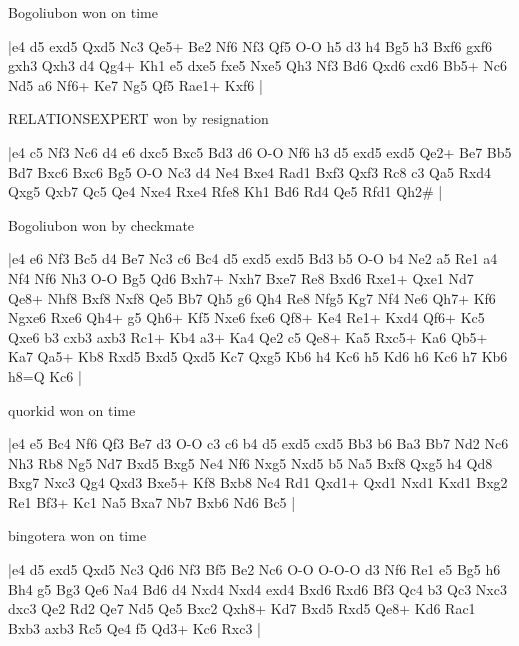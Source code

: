 \showboard

Bogoliubon won on time

\makegametitle
|e4 d5 exd5 Qxd5 Nc3 Qe5+ Be2 Nf6 Nf3 Qf5 O-O h5 d3 h4 Bg5 h3 Bxf6 gxf6 gxh3 Qxh3 d4 Qg4+ Kh1 e5 dxe5 fxe5 Nxe5 Qh3 Nf3 Bd6 Qxd6 cxd6 Bb5+ Nc6 Nd5 a6 Nf6+ Ke7 Ng5 Qf5 Rae1+ Kxf6  |

\showboard

RELATIONSEXPERT won by resignation

\makegametitle
|e4 c5 Nf3 Nc6 d4 e6 dxc5 Bxc5 Bd3 d6 O-O Nf6 h3 d5 exd5 exd5 Qe2+ Be7 Bb5 Bd7 Bxc6 Bxc6 Bg5 O-O Nc3 d4 Ne4 Bxe4 Rad1 Bxf3 Qxf3 Rc8 c3 Qa5 Rxd4 Qxg5 Qxb7 Qc5 Qe4 Nxe4 Rxe4 Rfe8 Kh1 Bd6 Rd4 Qe5 Rfd1 Qh2\#  |

\showboard

Bogoliubon won by checkmate

\makegametitle
|e4 e6 Nf3 Bc5 d4 Be7 Nc3 c6 Bc4 d5 exd5 exd5 Bd3 b5 O-O b4 Ne2 a5 Re1 a4 Nf4 Nf6 Nh3 O-O Bg5 Qd6 Bxh7+ Nxh7 Bxe7 Re8 Bxd6 Rxe1+ Qxe1 Nd7 Qe8+ Nhf8 Bxf8 Nxf8 Qe5 Bb7 Qh5 g6 Qh4 Re8 Nfg5 Kg7 Nf4 Ne6 Qh7+ Kf6 Ngxe6 Rxe6 Qh4+ g5 Qh6+ Kf5 Nxe6 fxe6 Qf8+ Ke4 Re1+ Kxd4 Qf6+ Kc5 Qxe6 b3 cxb3 axb3 Rc1+ Kb4 a3+ Ka4 Qe2 c5 Qe8+ Ka5 Rxc5+ Ka6 Qb5+ Ka7 Qa5+ Kb8 Rxd5 Bxd5 Qxd5 Kc7 Qxg5 Kb6 h4 Kc6 h5 Kd6 h6 Kc6 h7 Kb6 h8=Q Kc6  |

\showboard

quorkid won on time

\makegametitle
|e4 e5 Bc4 Nf6 Qf3 Be7 d3 O-O c3 c6 b4 d5 exd5 cxd5 Bb3 b6 Ba3 Bb7 Nd2 Nc6 Nh3 Rb8 Ng5 Nd7 Bxd5 Bxg5 Ne4 Nf6 Nxg5 Nxd5 b5 Na5 Bxf8 Qxg5 h4 Qd8 Bxg7 Nxc3 Qg4 Qxd3 Bxe5+ Kf8 Bxb8 Nc4 Rd1 Qxd1+ Qxd1 Nxd1 Kxd1 Bxg2 Re1 Bf3+ Kc1 Na5 Bxa7 Nb7 Bxb6 Nd6 Bc5  |

\showboard

bingotera won on time

\makegametitle
|e4 d5 exd5 Qxd5 Nc3 Qd6 Nf3 Bf5 Be2 Nc6 O-O O-O-O d3 Nf6 Re1 e5 Bg5 h6 Bh4 g5 Bg3 Qe6 Na4 Bd6 d4 Nxd4 Nxd4 exd4 Bxd6 Rxd6 Bf3 Qc4 b3 Qc3 Nxc3 dxc3 Qe2 Rd2 Qe7 Nd5 Qe5 Bxc2 Qxh8+ Kd7 Bxd5 Rxd5 Qe8+ Kd6 Rac1 Bxb3 axb3 Rc5 Qe4 f5 Qd3+ Kc6 Rxc3  |

